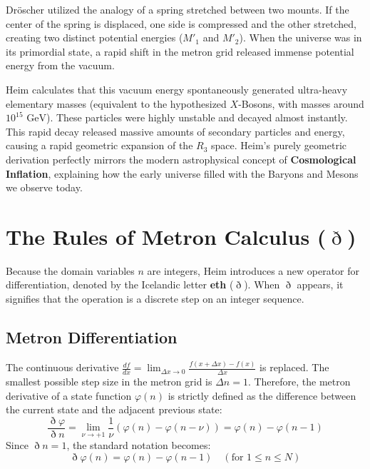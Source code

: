 \documentclass[11pt,a4paper,oneside]{article}
\newcommand{\ethop}{\eth}
\begin{document}
Dröscher utilized the analogy of a spring stretched between two mounts. If the center of the spring is displaced, one side is compressed and the other stretched, creating two distinct potential energies ($M'_1$ and $M'_2$). When the universe was in its primordial state, a rapid shift in the metron grid released immense potential energy from the vacuum. 

Heim calculates that this vacuum energy spontaneously generated ultra-heavy elementary masses (equivalent to the hypothesized $X$-Bosons, with masses around $10^{15} \text{ GeV}$). These particles were highly unstable and decayed almost instantly. This rapid decay released massive amounts of secondary particles and energy, causing a rapid geometric expansion of the $R_3$ space. Heim's purely geometric derivation perfectly mirrors the modern astrophysical concept of \textbf{Cosmological Inflation}, explaining how the early universe filled with the Baryons and Mesons we observe today.

\section{The Rules of Metron Calculus (\texorpdfstring{$\ethop$}{eth})}

Because the domain variables $n$ are integers, Heim introduces a new operator for differentiation, denoted by the Icelandic letter \textbf{eth} ($\ethop$). When $\ethop$ appears, it signifies that the operation is a discrete step on an integer sequence.

\subsection{Metron Differentiation}

The continuous derivative $\frac{df}{dx} = \lim_{\Delta x \to 0} \frac{f(x+\Delta x) - f(x)}{\Delta x}$ is replaced. The smallest possible step size in the metron grid is $\Delta n = 1$. Therefore, the metron derivative of a state function $\varphi(n)$ is strictly defined as the difference between the current state and the adjacent previous state:
\begin{equation}
    \frac{\ethop \varphi}{\ethop n} = \lim_{\nu \to +1} \frac{1}{\nu}(\varphi(n) - \varphi(n-\nu)) = \varphi(n) - \varphi(n-1)
\end{equation}
Since $\ethop n = 1$, the standard notation becomes:
\begin{equation}
    \ethop \varphi(n) = \varphi(n) - \varphi(n-1) \quad (\text{for } 1 \le n \le N)
\end{equation}
\end{document}
